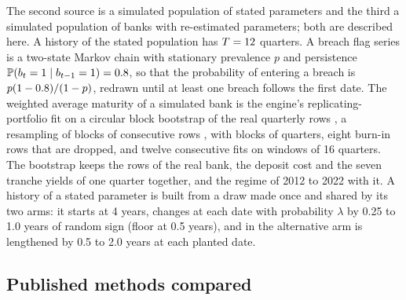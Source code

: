 The second source is a simulated population of stated parameters and the third a simulated population of banks with re-estimated parameters; both are described here. A history of the stated population has $T=12{}$ quarters. A breach flag series is a two-state Markov chain with stationary prevalence $p$ and persistence $\mathbb{P}(b_t=1\mid b_{t-1}=1)=0.8{}$, so that the probability of entering a breach is $p(1-0.8{})/(1-p)$, redrawn until at least one breach follows the first date. The weighted average maturity of a simulated bank is the engine's replicating-portfolio fit on a circular block bootstrap of the real quarterly rows \citep{politis1992}, a resampling of blocks of consecutive rows \citep{kunsch1989}, with blocks of \blockLength{} quarters, eight burn-in rows that are dropped, and twelve consecutive fits on windows of 16 quarters. The bootstrap keeps the rows of the real bank, the deposit cost and the seven tranche yields of one quarter together, and the regime of 2012 to 2022 with it. A history of a stated parameter is built from a draw made once and shared by its two arms: it starts at 4 years, changes at each date with probability $\lambda$ by 0.25 to 1.0 years of random sign (floor at 0.5 years), and in the alternative arm is lengthened by 0.5 to 2.0 years at each planted date.

\subsection{Published methods compared}
\label{sec:design-comparators}

